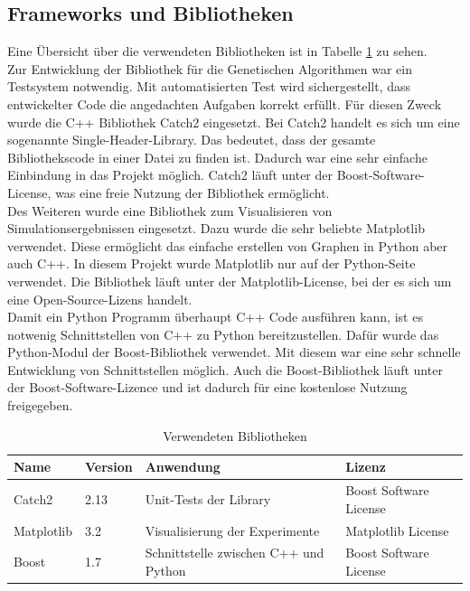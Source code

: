 \subsection{Frameworks und Bibliotheken}
Eine Übersicht über die verwendeten Bibliotheken ist in Tabelle \ref{tab:bibs} zu sehen.\\
Zur Entwicklung der Bibliothek für die Genetischen Algorithmen war ein Testsystem notwendig. Mit automatisierten Test wird sichergestellt, dass entwickelter Code die angedachten Aufgaben korrekt erfüllt.
Für diesen Zweck wurde die C++ Bibliothek Catch2 eingesetzt. Bei Catch2 handelt es sich um eine sogenannte Single-Header-Library. Das bedeutet, dass der gesamte Bibliothekscode in einer Datei zu finden ist.
Dadurch war eine sehr einfache Einbindung in das Projekt möglich. Catch2 läuft unter der Boost-Software-License, was eine freie Nutzung der Bibliothek ermöglicht.\\
Des Weiteren wurde eine Bibliothek zum Visualisieren von Simulationsergebnissen eingesetzt. Dazu wurde die sehr beliebte Matplotlib verwendet. Diese ermöglicht das einfache erstellen von Graphen in Python aber auch C++.
In diesem Projekt wurde Matplotlib nur auf der Python-Seite verwendet. Die Bibliothek läuft unter der Matplotlib-License, bei der es sich um eine Open-Source-Lizens handelt.\\
Damit ein Python Programm überhaupt C++ Code ausführen kann, ist es notwenig Schnittstellen von C++ zu Python bereitzustellen. Dafür wurde das Python-Modul der Boost-Bibliothek verwendet. Mit diesem war eine sehr schnelle Entwicklung von Schnittstellen möglich.
Auch die Boost-Bibliothek läuft unter der Boost-Software-Lizence und ist dadurch für eine kostenlose Nutzung freigegeben.
\begin{table}
\caption{Verwendeten Bibliotheken}
\begin{tabular}{|l|l|l|l|}
 Name & Version & Anwendung & Lizenz \\ 
\hline
 Catch2 & 2.13 & Unit-Tests der Library & Boost Software License \cite{catch2} \\  
 Matplotlib & 3.2 & Visualisierung der Experimente & Matplotlib License \cite{matplotlib} \\
 Boost & 1.7 & Schnittstelle zwischen C++ und Python & Boost Software License  \cite{boost}   
\end{tabular}
\label{tab:bibs}
\end{table}

